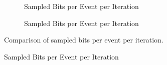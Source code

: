 \begin{landscape}
\begin{figure}
    \centering
    \begin{subfigure}[t]{0.663\textwidth}
        \centering
        
        \caption{Sampled Bits per Event per Iteration}
        \label{fig:canopy_rel_error_plot_1}
    \end{subfigure}
    \hfill
    \begin{subfigure}[t]{0.659\textwidth}
        \centering
        
        \caption{Sampled Bits per Event per Iteration}
        \label{fig:canopy_rel_error_plot_2}
    \end{subfigure}
    \caption{Comparison of sampled bits per event per iteration.}
\end{figure}
\end{landscape}

\begin{figure}
    
    \caption{Sampled Bits per Event per Iteration}
    \label{fig:sampled_bits_mem}
\end{figure}